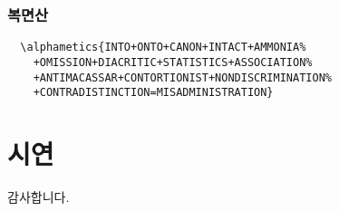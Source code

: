 \documentclass{beamer}
\newcommand{\alphametics}[2][v]{\directlua{puzzle('#1','#2')}}
\begin{document}
%
\begin{frame}[fragile]
  \frametitle{복면산}
  \footnotesize
\begin{verbatim}
  \alphametics{INTO+ONTO+CANON+INTACT+AMMONIA%
    +OMISSION+DIACRITIC+STATISTICS+ASSOCIATION%
    +ANTIMACASSAR+CONTORTIONIST+NONDISCRIMINATION%
    +CONTRADISTINCTION=MISADMINISTRATION}
\end{verbatim}
\end{frame}

%
\section{시연}

%
\begin{frame}
  \huge
  \centering 감사합니다.
\end{frame}
\end{document}
